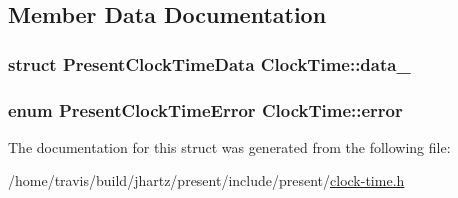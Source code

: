 \subsection{\-Member \-Data \-Documentation}
\hypertarget{structClockTime_a3fe115dffef3ba153e1fff6e0b2c0a23}{
\subsubsection[{data\-\_\-}]{\setlength{\rightskip}{0pt plus 5cm}struct \-Present\-Clock\-Time\-Data {\bf \-Clock\-Time\-::data\-\_\-}}}\label{structClockTime_a3fe115dffef3ba153e1fff6e0b2c0a23}
\hypertarget{structClockTime_a58f5305f36468eee0d1c489b5d72d717}{
\subsubsection[{error}]{\setlength{\rightskip}{0pt plus 5cm}enum {\bf \-Present\-Clock\-Time\-Error} {\bf \-Clock\-Time\-::error}}}\label{structClockTime_a58f5305f36468eee0d1c489b5d72d717}


\-The documentation for this struct was generated from the following file\-:\begin{DoxyCompactItemize}
\item 
/home/travis/build/jhartz/present/include/present/\hyperlink{clock-time_8h}{clock-\/time.\-h}\end{DoxyCompactItemize}

